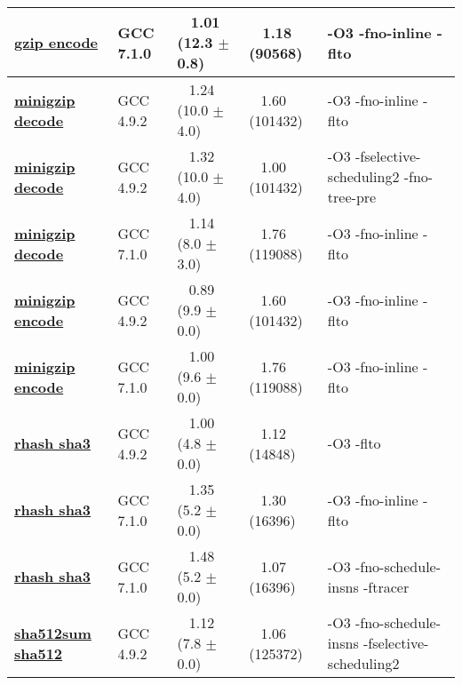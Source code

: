 \begin{tabular}{|l|l|p{1.2in}|p{0.9in}|p{1.8in}|}
     \hline
      \textbf{ \href{http://cknowledge.org/repo/web.php?wcid=experiment:7bd35343c393218c\&subpoint=ea66fb473741f8ba}{gzip encode} } &  GCC 7.1.0  &  ~ 1.01 (12.3 $\pm$ 0.8)  &  ~ 1.18 (90568)  & {\small -O3 -fno-inline -flto }\\
     \hline
      \textbf{ \href{http://cknowledge.org/repo/web.php?wcid=experiment:3308b411e99c6c19\&subpoint=1970017ea1e6fd3f}{minigzip decode} } &  GCC 4.9.2  &  ~ 1.24 (10.0 $\pm$ 4.0)  &  ~ 1.60 (101432)  & {\small -O3 -fno-inline -flto }\\
     \hline
      \textbf{ \href{http://cknowledge.org/repo/web.php?wcid=experiment:3308b411e99c6c19\&subpoint=704e0a8e94359933}{minigzip decode} } &  GCC 4.9.2  &  ~ 1.32 (10.0 $\pm$ 4.0)  &  ~ 1.00 (101432)  & {\small -O3 -fselective-scheduling2 -fno-tree-pre }\\
     \hline
      \textbf{ \href{http://cknowledge.org/repo/web.php?wcid=experiment:b9728f4c7b36ac8a\&subpoint=f72e2b4f5e47b98c}{minigzip decode} } &  GCC 7.1.0  &  ~ 1.14 (8.0 $\pm$ 3.0)  &  ~ 1.76 (119088)  & {\small -O3 -fno-inline -flto }\\
     \hline
      \textbf{ \href{http://cknowledge.org/repo/web.php?wcid=experiment:8c4b2b03f4aa21a7\&subpoint=243c5a4fc20ee826}{minigzip encode} } &  GCC 4.9.2  &  ~ 0.89 (9.9 $\pm$ 0.0)  &  ~ 1.60 (101432)  & {\small -O3 -fno-inline -flto }\\
     \hline
      \textbf{ \href{http://cknowledge.org/repo/web.php?wcid=experiment:18828143558b3c2f\&subpoint=0e1438a8a38e6fd6}{minigzip encode} } &  GCC 7.1.0  &  ~ 1.00 (9.6 $\pm$ 0.0)  &  ~ 1.76 (119088)  & {\small -O3 -fno-inline -flto }\\
     \hline
      \textbf{ \href{http://cknowledge.org/repo/web.php?wcid=experiment:7ca1118331485cb4\&subpoint=4b74181efc011cbd}{rhash sha3} } &  GCC 4.9.2  &  ~ 1.00 (4.8 $\pm$ 0.0)  &  ~ 1.12 (14848)  & {\small -O3 -flto }\\
     \hline
      \textbf{ \href{http://cknowledge.org/repo/web.php?wcid=experiment:94a5792a3a4b925f\&subpoint=fc8e3a495ab4298c}{rhash sha3} } &  GCC 7.1.0  &  ~ 1.35 (5.2 $\pm$ 0.0)  &  ~ 1.30 (16396)  & {\small -O3 -fno-inline -flto }\\
     \hline
      \textbf{ \href{http://cknowledge.org/repo/web.php?wcid=experiment:94a5792a3a4b925f\&subpoint=dab8b6c57a392ca5}{rhash sha3} } &  GCC 7.1.0  &  ~ 1.48 (5.2 $\pm$ 0.0)  &  ~ 1.07 (16396)  & {\small -O3 -fno-schedule-insns -ftracer }\\
     \hline
      \textbf{ \href{http://cknowledge.org/repo/web.php?wcid=experiment:b8ab612f1524fa3b\&subpoint=042129a7110f3e31}{sha512sum sha512} } &  GCC 4.9.2  &  ~ 1.12 (7.8 $\pm$ 0.0)  &  ~ 1.06 (125372)  & {\small -O3 -fno-schedule-insns -fselective-scheduling2 }\\

\end{tabular}

